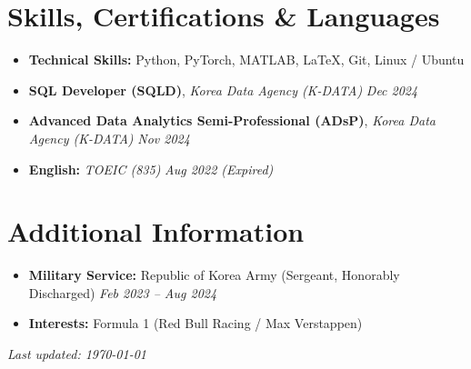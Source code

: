 \documentclass[a4paper,10pt]{article}
\begin{document}
\section{Skills, Certifications \& Languages}
\begin{itemize}[leftmargin=3.5mm, itemsep=1.2mm]
    \item \textbf{Technical Skills:} Python, PyTorch, MATLAB, \LaTeX, Git, Linux / Ubuntu
    \item \textbf{SQL Developer (SQLD)}, \textit{\small Korea Data Agency (K-DATA)} \hfill \textit{\footnotesize Dec 2024}
    \item \textbf{Advanced Data Analytics Semi-Professional (ADsP)}, \textit{\small Korea Data Agency (K-DATA)} \hfill \textit{\footnotesize Nov 2024}
    \item \textbf{English:} \textit{TOEIC (835)} \hfill \textit{\footnotesize Aug 2022 (Expired)}
\end{itemize}

\section{Additional Information}
\begin{itemize}[leftmargin=3.5mm, itemsep=1.2mm]
    \item \textbf{Military Service:} Republic of Korea Army (Sergeant, Honorably Discharged) \hfill \textit{\footnotesize Feb 2023 -- Aug 2024}
    \item \textbf{Interests:} Formula 1 (Red Bull Racing / Max Verstappen)
\end{itemize}

\vspace{6mm}
\hfill {\color{subtext}\textit{\small Last updated: \today}}
\end{document}
